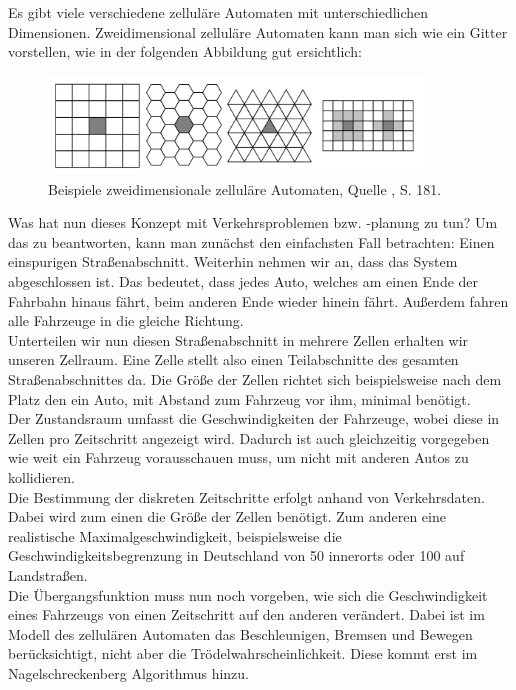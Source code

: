 Es gibt viele verschiedene zelluläre Automaten mit unterschiedlichen Dimensionen. Zweidimensional zelluläre Automaten kann man sich wie ein Gitter vorstellen, wie in der folgenden Abbildung gut ersichtlich:

\begin{figure}[h]
\centering
\includegraphics[width=10cm]{2_ZA_Beispiel.PNG}
\caption{Beispiele zweidimensionale zelluläre Automaten, Quelle \cite{book:bungartz}, S. 181.}
\end{figure}

Was hat nun dieses Konzept mit Verkehrsproblemen bzw. -planung zu tun? Um das zu beantworten, kann man zunächst den einfachsten Fall betrachten: Einen einspurigen Straßenabschnitt. Weiterhin nehmen wir an, dass das System abgeschlossen ist. Das bedeutet, dass jedes Auto, welches am einen Ende der Fahrbahn hinaus fährt, beim anderen Ende wieder hinein fährt. Außerdem fahren alle Fahrzeuge in die gleiche Richtung. \\

Unterteilen wir nun diesen Straßenabschnitt in mehrere Zellen erhalten wir unseren Zellraum. Eine Zelle stellt also einen Teilabschnitte des gesamten Straßenabschnittes da. Die Größe der Zellen richtet sich beispielsweise nach dem Platz den ein Auto, mit Abstand zum Fahrzeug vor ihm, minimal benötigt. \\

Der Zustandsraum umfasst die Geschwindigkeiten der Fahrzeuge, wobei diese in Zellen pro Zeitschritt angezeigt wird. Dadurch ist auch gleichzeitig vorgegeben wie weit ein Fahrzeug vorausschauen muss, um nicht mit anderen Autos zu kollidieren. \\

Die Bestimmung der diskreten Zeitschritte erfolgt anhand von Verkehrsdaten. Dabei wird zum einen die Größe der Zellen benötigt. Zum anderen eine realistische Maximalgeschwindigkeit, beispielsweise die Geschwindigkeitsbegrenzung in Deutschland von 50 innerorts oder 100 auf Landstraßen.  \\

Die Übergangsfunktion muss nun noch vorgeben, wie sich die Geschwindigkeit eines Fahrzeugs von einen Zeitschritt auf den anderen verändert. Dabei ist im Modell des zellulären Automaten das Beschleunigen, Bremsen und Bewegen berücksichtigt, nicht aber die Trödelwahrscheinlichkeit. Diese kommt erst im Nagelschreckenberg Algorithmus hinzu. \\

